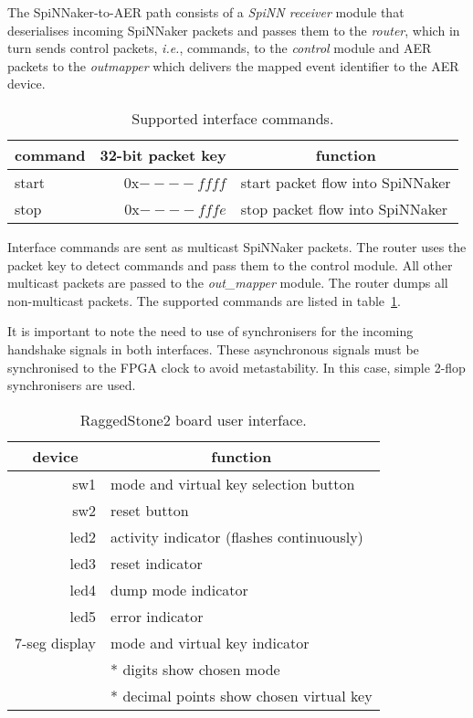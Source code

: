 The SpiNNaker-to-AER path consists of a \emph{SpiNN receiver} module
that deserialises incoming SpiNNaker packets and passes them to
the \emph{router}, which in turn sends control packets, \emph{i.e.},
commands, to the \emph{control} module and AER packets to
the \emph{out\-mapper} which delivers the mapped event identifier to
the AER device.


\begin{table}[!h]
\begin{center}
\begin{tabular}{| l | r | l |}
\hline
\multicolumn{1}{|c}{command} & \multicolumn{1}{|c|}{32-bit packet key}& \multicolumn{1}{|c|}{function} \\
\hline
start   & 0x$----ffff$ & start packet flow into SpiNNaker \\
stop    & 0x$----fffe$ & stop packet flow into SpiNNaker \\
\hline
\end{tabular}
\caption{Supported interface commands.}
\label{tab:commands}
\end{center}
\end{table}


Interface commands are sent as multicast SpiNNaker packets. The router
uses the packet key to detect commands and pass them to the control
module. All other multicast packets are passed to
the \emph{out\_mapper} module. The router dumps all non-multicast
packets. The supported commands are listed in
table~\ref{tab:commands}.

It is important to note the need to use of synchronisers for the
incoming handshake signals in both interfaces. These asynchronous
signals must be synchronised to the FPGA clock to avoid
metastability. In this case, simple 2-flop synchronisers are used.\\


\begin{table}[!h]
\begin{center}
\begin{tabular}{| r | l |}
\hline
\multicolumn{1}{|c}{device} & \multicolumn{1}{|c|}{function} \\
\hline
sw1           & mode and virtual key selection button \\
sw2           & reset button \\
\hline
led2          & activity indicator (flashes continuously) \\
led3          & reset indicator \\
led4          & dump mode indicator \\
led5          & error indicator \\
\hline
7-seg display & mode and virtual key indicator \\
              & * digits show chosen mode \\
              & * decimal points show chosen virtual key \\
\hline
\end{tabular}
\caption{RaggedStone2 board user interface.}
\label{tab:userif}
\end{center}
\end{table}



